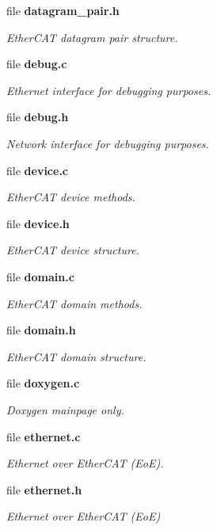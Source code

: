 \begin{DoxyCompactItemize}
file {\bf datagram\-\_\-pair.\-h}
\begin{DoxyCompactList}\small\item\em Ether\-C\-A\-T datagram pair structure. \end{DoxyCompactList}\item 
file {\bf debug.\-c}
\begin{DoxyCompactList}\small\item\em Ethernet interface for debugging purposes. \end{DoxyCompactList}\item 
file {\bf debug.\-h}
\begin{DoxyCompactList}\small\item\em Network interface for debugging purposes. \end{DoxyCompactList}\item 
file {\bf device.\-c}
\begin{DoxyCompactList}\small\item\em Ether\-C\-A\-T device methods. \end{DoxyCompactList}\item 
file {\bf device.\-h}
\begin{DoxyCompactList}\small\item\em Ether\-C\-A\-T device structure. \end{DoxyCompactList}\item 
file {\bf domain.\-c}
\begin{DoxyCompactList}\small\item\em Ether\-C\-A\-T domain methods. \end{DoxyCompactList}\item 
file {\bf domain.\-h}
\begin{DoxyCompactList}\small\item\em Ether\-C\-A\-T domain structure. \end{DoxyCompactList}\item 
file {\bf doxygen.\-c}
\begin{DoxyCompactList}\small\item\em Doxygen mainpage only. \end{DoxyCompactList}\item 
file {\bf ethernet.\-c}
\begin{DoxyCompactList}\small\item\em Ethernet over Ether\-C\-A\-T (Eo\-E). \end{DoxyCompactList}\item 
file {\bf ethernet.\-h}
\begin{DoxyCompactList}\small\item\em Ethernet over Ether\-C\-A\-T (Eo\-E) \end{DoxyCompactList}\item 

\end{DoxyCompactItemize}
